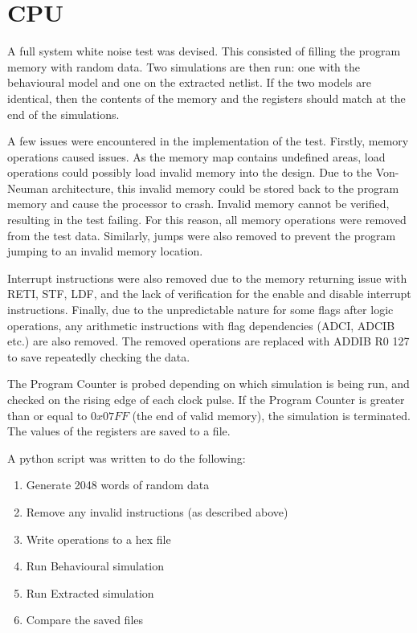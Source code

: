 
\section{CPU}


A full system white noise test was devised. 
This consisted of filling the program memory with random data. 
Two simulations are then run: one with the behavioural model and one on the extracted netlist. 
If the two models are identical, then the contents of the memory and the registers should match at the end of the simulations.

A few issues were encountered in the implementation of the test.
Firstly, memory operations caused issues. 
As the memory map contains undefined areas, load operations could possibly load invalid memory into the design.
Due to the Von-Neuman architecture, this invalid memory could be stored back to the program memory and cause the processor to crash. 
Invalid memory cannot be verified, resulting in the test failing. 
For this reason, all memory operations were removed from the test data.
Similarly, jumps were also removed to prevent the program jumping to an invalid memory location. 

Interrupt instructions were also removed due to the memory returning issue with RETI, STF, LDF, and the lack of verification for the enable and disable interrupt instructions. 
Finally, due to the unpredictable nature for some flags after logic operations, any arithmetic instructions with flag dependencies (ADCI, ADCIB etc.) are also removed. 
The removed operations are replaced with ADDIB R0 127 to save repeatedly checking the data. 

The Program Counter is probed depending on which simulation is being run, and checked on the rising edge of each clock pulse. %
If the Program Counter is greater than or equal to $0x07FF$ (the end of valid memory), the simulation is terminated.
The values of the registers are saved to a file. 

\noindent A python script was written to do the following:
\begin{enumerate}
\item Generate 2048 words of random data
\item Remove any invalid instructions (as described above)
\item Write operations to a hex file
\item Run Behavioural simulation
\item Run Extracted simulation
\item Compare the saved files
\end{enumerate}

